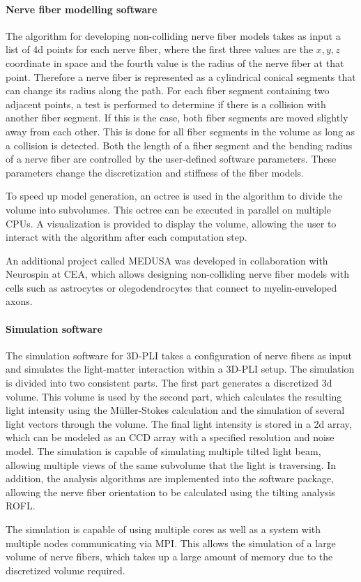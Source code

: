 \paragraph{Nerve fiber modelling software}
% 
The algorithm for developing non-colliding nerve fiber models takes as input a list of 4d points for each nerve fiber, where the first three values are the $x,y,z$ coordinate in space and the fourth value is the radius of the nerve fiber at that point.
Therefore a nerve fiber is represented as a cylindrical conical segments that can change its radius along the path.
For each fiber segment containing two adjacent points, a test is performed to determine if there is a collision with another fiber segment.
If this is the case, both fiber segments are moved slightly away from each other.
This is done for all fiber segments in the volume as long as a collision is detected.
Both the length of a fiber segment and the bending radius of a nerve fiber are controlled by the user-defined software parameters.
These parameters change the discretization and stiffness of the fiber models.
\par
% 
To speed up model generation, an octree is used in the algorithm to divide the volume into subvolumes.
This octree can be executed in parallel on multiple \acp{CPU}.
A visualization is provided to display the volume, allowing the user to interact with the algorithm after each computation step.
\par
% 
An additional project called \ac{MEDUSA} was developed in collaboration with Neurospin at \ac{CEA}, which allows designing non-colliding nerve fiber models with cells such as astrocytes or olegodendrocytes that connect to myelin-enveloped axons.
% 
% 
% 
\paragraph{Simulation software}
% 
The simulation software for \ac{3D-PLI} takes a configuration of nerve fibers as input and simulates the light-matter interaction within a \ac{3D-PLI} setup.
The simulation is divided into two consistent parts.
The first part generates a discretized 3d volume.
This volume is used by the second part, which calculates the resulting light intensity using the M\"{u}ller-Stokes calculation and the simulation of several light vectors through the volume.
The final light intensity is stored in a 2d array, which can be modeled as an \ac{CCD} array with a specified resolution and noise model.
The simulation is capable of simulating multiple tilted light beam, allowing multiple views of the same subvolume that the light is traversing.
In addition, the analysis algorithms are implemented into the software package, allowing the nerve fiber orientation to be calculated using the tilting analysis \ac{ROFL}.
\par
% 
The simulation is capable of using multiple cores as well as a system with multiple nodes communicating via \ac{MPI}.
This allows the simulation of a large volume of nerve fibers, which takes up a large amount of memory due to the discretized volume required.
% 
% 
% 
